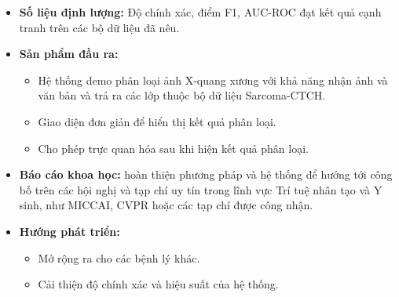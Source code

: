   \begin{itemize}
      \item \textbf{Số liệu định lượng:} Độ chính xác, điểm F1, AUC-ROC đạt kết quả cạnh tranh trên các bộ dữ liệu đã nêu.

      \item \textbf{Sản phẩm đầu ra:}
      \begin{itemize}
          \item Hệ thống demo phân loại ảnh X-quang xương với khả năng nhận ảnh và văn bản và trả ra các lớp thuộc bộ dữ liệu Sarcoma-CTCH.

          \item Giao diện đơn giản để hiển thị kết quả phân loại.

          \item Cho phép trực quan hóa sau khi hiện kết quả phân loại.
      \end{itemize}

      \item \textbf{Báo cáo khoa học:} hoàn thiện phương pháp và hệ thống để hướng tới công bố trên các hội nghị và tạp chí uy tín trong lĩnh vực Trí tuệ nhân tạo và Y sinh, như MICCAI, CVPR hoặc các tạp chí được công nhận.

      \item \textbf{Hướng phát triển:}
      \begin{itemize}
          \item Mở rộng ra cho các bệnh lý khác.
          \item Cải thiện độ chính xác và hiệu suất của hệ thống.
      \end{itemize}
  \end{itemize}

  \pagebreak
  
